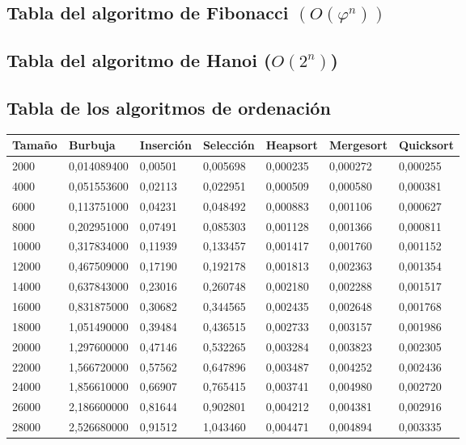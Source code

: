 \documentclass[a4paper, 11pt]{article}
\begin{document}
\subsection{Tabla del algoritmo de Fibonacci $(O(\varphi^n))$}
   

\subsection{Tabla del algoritmo de Hanoi ($O(2^n)$)}
   

\subsection{Tabla de los algoritmos de ordenación}

\begin{tabular}{|l|l|l|l|l|l|l|}
	\hline
	Tamaño	&Burbuja&	Inserción&	Selección&	Heapsort&	Mergesort&	Quicksort\\
	\hline
	\hline
	2000&	0,014089400&	0,00501	&0,005698&	0,000235&	0,000272&	0,000255\\
	\hline
	4000&	0,051553600&	0,02113	&0,022951&	0,000509&	0,000580&	0,000381\\
	\hline
	6000&	0,113751000&	0,04231&	0,048492&	0,000883&	0,001106&	0,000627\\
	\hline
	8000&	0,202951000&	0,07491&	0,085303&	0,001128&	0,001366&	0,000811\\
	\hline
	10000&	0,317834000&	0,11939&	0,133457&	0,001417&	0,001760&	0,001152\\
	\hline
	12000&	0,467509000&	0,17190&	0,192178&	0,001813&	0,002363&	0,001354\\
	\hline
	14000&	0,637843000&	0,23016&	0,260748&	0,002180&	0,002288&	0,001517\\
	\hline
	16000&	0,831875000&	0,30682&	0,344565&	0,002435&	0,002648&	0,001768\\
	\hline
	18000&	1,051490000&	0,39484&	0,436515&	0,002733&	0,003157&	0,001986\\
	\hline
	20000&	1,297600000&	0,47146&	0,532265&	0,003284&	0,003823&	0,002305\\
	\hline
	22000&	1,566720000&	0,57562&	0,647896&	0,003487&	0,004252&	0,002436\\
	\hline
	24000&	1,856610000&	0,66907&	0,765415&	0,003741&	0,004980&	0,002720\\
	\hline
	26000&	2,186600000&	0,81644&	0,902801&	0,004212&	0,004381&	0,002916\\
	\hline
	28000&	2,526680000&	0,91512&	1,043460&	0,004471&	0,004894&	0,003335\\

\end{tabular}
\end{document}
